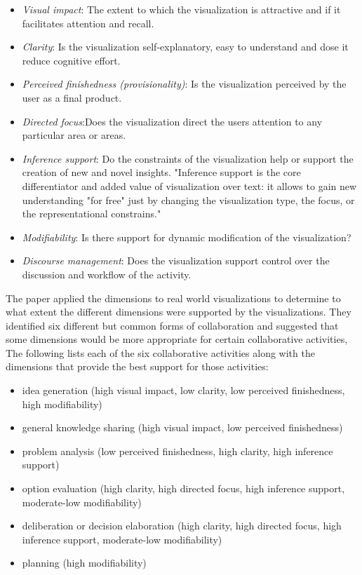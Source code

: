 \documentclass{sig-alternate}
\begin{document}
\begin{itemize}
\item \emph{Visual impact}: The extent to which the visualization is attractive and if it facilitates attention and recall.
\item \emph{Clarity}: Is the visualization self-explanatory, easy to understand and dose it reduce cognitive effort.
\item \emph{Perceived finishedness (provisionality)}: Is the visualization perceived by the user as a final product.
\item \emph{Directed focus}:Does the visualization direct the users attention to any particular area or areas.
\item \emph{Inference support}: Do the constraints of the visualization help or  support the creation of new and novel insights. "Inference support is the core differentiator and added value of visualization over text: it allows to gain new understanding "for free" just by changing the visualization type, the focus, or the representational constrains."
\item \emph{Modifiability}: Is there support for dynamic modification of the visualization?
\item \emph{Discourse management}: Does the visualization support control over the discussion and workflow of the activity.
\end{itemize}
The paper applied the dimensions to real world visualizations to determine to what extent the different dimensions were supported by the visualizations. They identified six different but common forms of collaboration and suggested that some dimensions would be more appropriate for certain collaborative activities, The following lists each of the six collaborative activities along with the dimensions that provide the best support for those activities:
\begin{itemize}
\item idea generation (high visual impact, low clarity, low perceived finishedness, high modifiability)
\item general knowledge sharing (high visual impact, low perceived finishedness)
\item problem analysis (low perceived finishedness, high clarity, high inference support)
\item option evaluation (high clarity, high directed focus, high inference support, moderate-low modifiability)
\item deliberation or decision elaboration (high clarity, high directed focus, high inference support, moderate-low modifiability)
\item planning (high modifiability)
\end{itemize}
\end{document}
